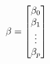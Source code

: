 \documentclass[preview]{standalone}
\begin{document}
\begin{align*}
\special{dvisvgm:raw <g id='unique000'>}\beta=\begin{bmatrix}\beta_0\\\beta_1\\\vdots\\\beta_p\end{bmatrix}\special{dvisvgm:raw </g>}
\end{align*}
\end{document}
